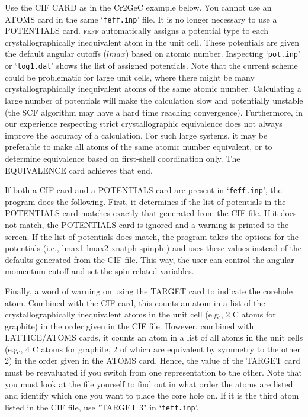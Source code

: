 \documentclass[11pt,oneside]{report} %
\renewcommand{\htmlref}[2]{\hyperlink{#2}{#1}}
\newcommand{\program}[1]{\textsc{#1}}
\newcommand{\feff}{\program{feff}}
\newcommand{\file}[1]{`\texttt{#1}'}
\renewcommand{\htmlref}[2]{{#1}} %
\begin{document}
Use the CIF CARD as in the \htmlref{Cr2GeC example}{K-space-example-Cr2GeC} below.  You cannot use an ATOMS card in the same \file{feff.inp} file.  It is no longer necessary to use a POTENTIALS card.  {\feff} automatically assigns a potential type to each crystallographically inequivalent atom in the unit cell.  These potentials are given the default angular cutoffs ($lmax$) based on atomic number.  Inspecting \file{pot.inp} or \file{log1.dat} shows the list of assigned potentials.  Note that the current scheme could be problematic for large unit cells, where there might be many crystallographically inequivalent atoms of the same atomic number.  Calculating a large number of potentials will make the calculation slow and potentially unstable (the SCF algorithm may have a hard time reaching convergence).  Furthermore, in our experience respecting strict crystallographic equivalence does not always improve the accuracy of a calculation.  For such large systems, it may be preferable to make all atoms of the same atomic number equivalent, or to determine equivalence based on first-shell coordination only.  The EQUIVALENCE card achieves that end.

If both a CIF card and a POTENTIALS card are present in \file{feff.inp}, the program does the following.  First, it determines if the list of potentials in the POTENTIALS card matches exactly that generated from the CIF file.  If it does not match, the POTENTIALS card is ignored and a warning is printed to the screen.  If the list of potentials does match, the program takes the options for the potentials (i.e.,  lmax1  lmax2  xnatph  spinph ) and uses these values instead of the defaults generated from the CIF file.  This way, the user can control the angular momentum cutoff and set the spin-related variables.

Finally, a word of warning on using the TARGET card to indicate the corehole atom.  Combined with the CIF card, this counts an atom in a list of the crystallographically inequivalent atoms in the unit cell (e.g., 2 C atoms for graphite) in the order given in the CIF file.  However, combined with LATTICE/ATOMS cards, it counts an atom in a list of all atoms in the unit cells (e.g., 4 C atoms for graphite, 2 of which are equivalent by symmetry to the other 2) in the order given in the ATOMS card.  Hence, the value of the TARGET card must be reevaluated if you switch from one representation to the other.  Note that 
you must look at the file yourself to find out in what order the atoms are listed and identify which one you want to place the core hole on.  If it is the third atom listed in the CIF file, use "TARGET 3" in \file{feff.inp}.
\end{document}
